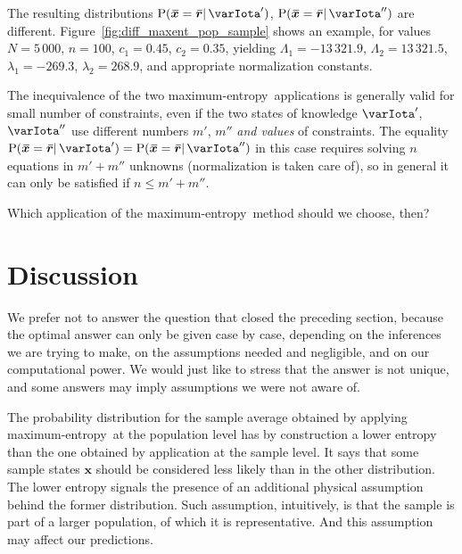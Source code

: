 \documentclass{article}
\theoremstyle{remark}
\theoremstyle{innote}
\renewcommand*{\|}{\mathpunct{|}}%
\renewcommand{\le}{\leqslant}%
\newcommand*{\p}{\mathrm{P}}%
\theoremstyle{simple}
\newcommand*{\widebar}[1]{{\mkern1.5mu\skew{2}\overline{\mkern-1.5mu#1\mkern-1.5mu}\mkern 1.5mu}}
\newcommand*{\sav}{\widebar} %
\newcommand*{\yxx}{x}%
\newcommand*{\yx}{\bm{\yxx}}%
\newcommand*{\yxs}{\sav{\yx}}%
\newcommand*{\yr}{\bm{r}}%
\newcommand*{\yrs}{\sav{\yr}}%
\newcommand*{\yHa}{\varIota'}
\newcommand*{\yHb}{\varIota''}
\newcommand*{\yL}{\varLambda}
\newcommand*{\yl}{\lambda}
\newcommand*{\me}{maximum-entropy}
\begin{document}
The resulting distributions $\p(\yxs = \yrs \| \yHa)$,
$\p(\yxs = \yrs \| \yHb)$ are different.
Figure~\ref{fig:diff_maxent_pop_sample} shows an example, for values
$N=5\,000$, $n=100$, $c_1=0.45$, $c_2=0.35$, yielding $\yL_1 = -13\,321.9$,
$\yL_2 = 13\,321.5$, $\yl_1=-269.3$, $\yl_2 = 268.9$, and appropriate
normalization constants.


The inequivalence of the two \me\ applications is generally valid for small
number of constraints, even if the two states of knowledge $\yHa$, $\yHb$
use different numbers $m'$, $m''$ \emph{and values} of constraints. The
equality $\p(\yxs = \yrs \| \yHa) = \p(\yxs = \yrs \| \yHb)$ in this case
requires solving $n$ equations in $m'+m''$ unknowns (normalization
is taken care of), so in general it can only be satisfied if $n\le m'+m''$.

\medskip

Which application of the \me\ method should we choose, then?

\section{Discussion}
\label{sec:discussion}

We prefer not to answer the question that closed the preceding section,
because the optimal answer can only be given case by case, depending on the
inferences we are trying to make, on the assumptions needed and negligible,
and on our computational power. We would just like to stress that the
answer is not unique, and some answers may imply assumptions we were not
aware of.

The probability distribution for the sample average obtained by applying
\me\ at the population level has by construction a lower entropy than the
one obtained by application at the sample level. It says that some sample
states $\yx$ should be considered less likely than in the other
distribution. The lower entropy signals the presence of an additional
physical assumption behind the former distribution. Such assumption,
intuitively, is that the sample is part of a larger population, of which it
is representative. And this assumption may affect our predictions.
\end{document}
